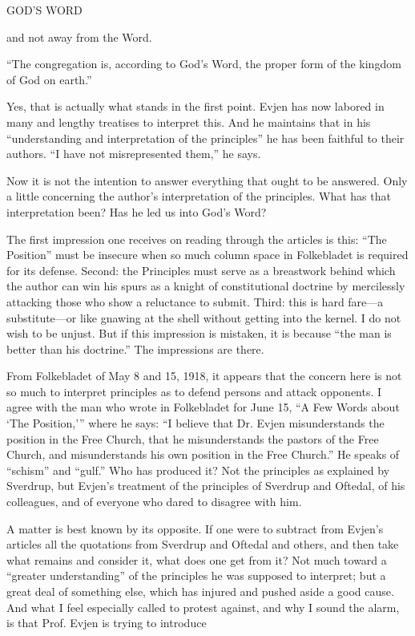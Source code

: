 GOD’S WORD

and not away from the Word.

“The congregation is, according to God’s Word, the proper form of the kingdom of God on earth.”

Yes, that is actually what stands in the first point. Evjen has now labored in many and lengthy treatises to interpret this. And he maintains that in his “understanding and interpretation of the principles” he has been faithful to their authors. “I have not misrepresented them,” he says.

Now it is not the intention to answer everything that ought to be answered. Only a little concerning the author’s interpretation of the principles. What has that interpretation been? Has he led us into God’s Word?

The first impression one receives on reading through the articles is this: “The Position” must be insecure when so much column space in Folkebladet is required for its defense. Second: the Principles must serve as a breastwork behind which the author can win his spurs as a knight of constitutional doctrine by mercilessly attacking those who show a reluctance to submit. Third: this is hard fare—a substitute—or like gnawing at the shell without getting into the kernel. I do not wish to be unjust. But if this impression is mistaken, it is because “the man is better than his doctrine.” The impressions are there.

From Folkebladet of May 8 and 15, 1918, it appears that the concern here is not so much to interpret principles as to defend persons and attack opponents. I agree with the man who wrote in Folkebladet for June 15, “A Few Words about ‘The Position,’” where he says: “I believe that Dr. Evjen misunderstands the position in the Free Church, that he misunderstands the pastors of the Free Church, and misunderstands his own position in the Free Church.” He speaks of “schism” and “gulf.” Who has produced it? Not the principles as explained by Sverdrup, but Evjen’s treatment of the principles of Sverdrup and Oftedal, of his colleagues, and of everyone who dared to disagree with him.

A matter is best known by its opposite. If one were to subtract from Evjen’s articles all the quotations from Sverdrup and Oftedal and others, and then take what remains and consider it, what does one get from it? Not much toward a “greater understanding” of the principles he was supposed to interpret; but a great deal of something else, which has injured and pushed aside a good cause. And what I feel especially called to protest against, and why I sound the alarm, is that Prof. Evjen is trying to introduce

